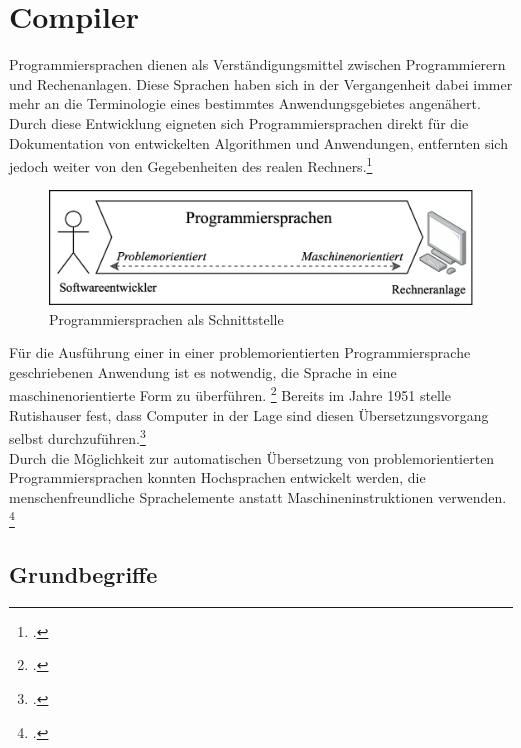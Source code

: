\chapter{Compiler}


Programmiersprachen dienen als Verständigungsmittel zwischen Programmierern und Rechenanlagen. Diese Sprachen haben sich in der Vergangenheit dabei immer mehr an die  Terminologie eines bestimmtes Anwendungsgebietes angenähert. Durch diese Entwicklung eigneten sich Programmiersprachen direkt für die Dokumentation von entwickelten Algorithmen und Anwendungen, entfernten sich jedoch weiter von den Gegebenheiten des realen Rechners.\footcite[Vgl.][S. 15]{Schneider1975}
\begin{figure}[h]
 \includegraphics[width=\textwidth,height=\textheight,keepaspectratio]{Images/LanguageIntermediary.png}
 \caption{Programmiersprachen als Schnittstelle}
 \label{fig:Programmiersprachen als Schnittstelle}
\end{figure}
Für die Ausführung einer in einer problemorientierten Programmiersprache geschriebenen Anwendung ist es notwendig, die Sprache in eine maschinenorientierte Form zu überführen. \footcite[Vgl.][S. 15]{Schneider1975} Bereits im Jahre 1951 stelle Rutishauser fest,  dass Computer in der Lage sind diesen Übersetzungsvorgang selbst durchzuführen.\footcite[Vgl.][S. 1]{Quelle fehlt! improve https://link.springer.com/article/10.1007/BF02009622}  %
\\
Durch die Möglichkeit zur automatischen Übersetzung von problemorientierten Programmiersprachen konnten Hochsprachen entwickelt werden, die menschenfreundliche Sprachelemente anstatt Maschineninstruktionen verwenden. \footcite[Vgl.][S. 47]{Wagenknecht2014}
\section{ Grundbegriffe}

